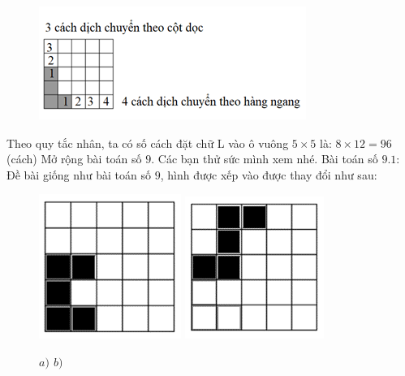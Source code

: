 \begin{multicols}{2}
\begin{figure}[H]
			\centering
			\vspace*{-10pt}
			\captionsetup{labelformat=empty, justification=centering}
			\includegraphics[width=1\linewidth]{_15}
			\vspace*{-15pt}
		\end{figure}
		Theo quy tắc nhân, ta có số cách đặt chữ L vào ô vuông $5\times 5$ là: $8\times12=96$ (cách)
	\vskip 0.1cm
	Mở rộng bài toán số $9$. Các bạn thử sức mình xem nhé.
	\vskip 0.1cm
	Bài toán số $9.1$: Đề bài giống như bài toán số $9$, hình được xếp vào được thay đổi như sau:
	\begin{figure}[H]
		\centering
		\vspace*{-5pt}
		\captionsetup{labelformat=empty, justification=centering}
		\includegraphics[height=0.4\linewidth]{_16}\quad
		\includegraphics[height=0.4\linewidth]{_17}
		\caption{\small\textit{$a)$ \hspace*{100pt} $b)$}}
		\vspace*{-15pt}

\end{figure}
\end{multicols}
